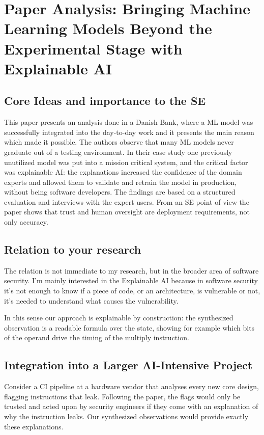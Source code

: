 \documentclass[11pt]{article}
\begin{document}
\section{Paper Analysis: Bringing Machine Learning Models Beyond the Experimental Stage with Explainable AI \cite{bank2025}}
\subsection{Core Ideas and importance to the SE}
This paper presents an analysis done in a Danish Bank, where a ML model was successfully integrated into the day-to-day work and it presents the main reason which made it possible.
The authors observe that many ML models never graduate out of a testing environment. In their case study one previously unutilized model was put into a mission critical system, and the critical factor was explainable AI: the explanations increased the confidence of the domain experts and allowed them to validate and retrain the model in production, without being software developers. The findings are based on a structured evaluation and interviews with the expert users. From an SE point of view the paper shows that trust and human oversight are deployment requirements, not only accuracy.
\subsection{Relation to your research}
The relation is not immediate to my research, but in the broader area of software security. 
I'm mainly interested in the Explainable AI because in software security it's not enough to know if a piece of code, or an architecture, is vulnerable or not, it's needed to understand what causes the vulnerability. 

In this sense our approach is explainable by construction: the synthesized observation is a readable formula over the state, showing for example which bits of the operand drive the timing of the multiply instruction.

\subsection{Integration into a Larger AI-Intensive Project}

Consider a CI pipeline at a hardware vendor that analyses every new core design, flagging instructions that leak. Following the paper, the flags would only be trusted and acted upon by security engineers if they come with an explanation of why the instruction leaks. Our synthesized observations would provide exactly these explanations.
\end{document}
